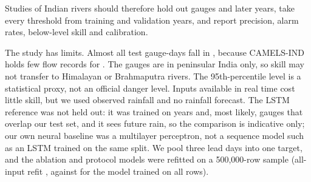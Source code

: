 \documentclass[conference]{IEEEtran}
\begin{document}

Studies of Indian rivers should therefore hold out gauges and later years, take every threshold from training and validation years, and report precision, alarm rates, below-level skill and calibration.

The study has limits. Almost all test gauge-days fall in \YearsBig, because CAMELS-IND holds few flow records for \YearsSmall. The gauges are in peninsular India only, so skill may not transfer to Himalayan or Brahmaputra rivers. The 95th-percentile level is a statistical proxy, not an official danger level. Inputs available in real time cost little skill, but we used observed rainfall and no rainfall forecast. The LSTM reference was not held out: it was trained on years and, most likely, gauges that overlap our test set, and it sees future rain, so the comparison is indicative only; our own neural baseline was a multilayer perceptron, not a sequence model such as an LSTM trained on the same split. We pool three lead days into one target, and the ablation and protocol models were refitted on a 500,000-row sample (all-input refit \AblAllBA, against \XgbBA{} for the model trained on all rows).
\end{document}
